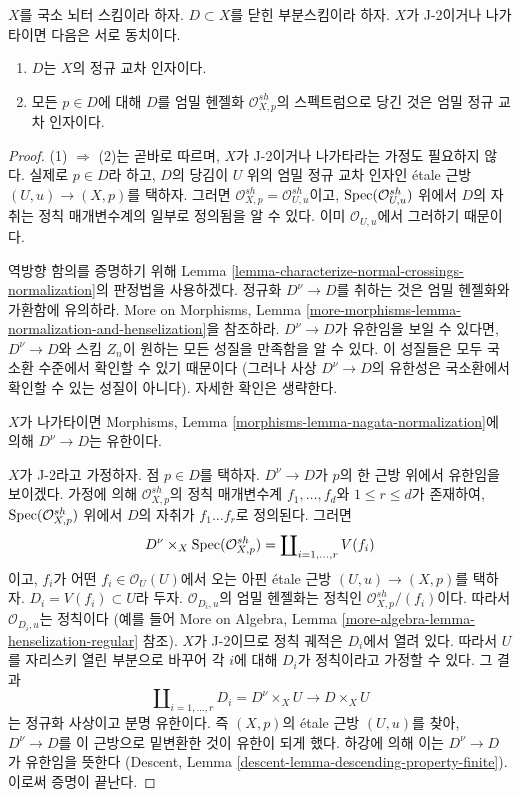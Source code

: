 \begin{lemma}
\label{lemma-characterize-normal-crossings}
$X$를 국소 뇌터 스킴이라 하자. $D \subset X$를 닫힌 부분스킴이라 하자.
$X$가 J-2이거나 나가타이면 다음은 서로 동치이다.
\begin{enumerate}
\item $D$는 $X$의 정규 교차 인자이다.
\item 모든 $p \in D$에 대해 $D$를 엄밀 헨젤화
$\mathcal{O}_{X, p}^{sh}$의 스펙트럼으로 당긴 것은
엄밀 정규 교차 인자이다.
\end{enumerate}
\end{lemma}

\begin{proof}
(1) $\Rightarrow$ (2)는 곧바로 따르며,
$X$가 J-2이거나 나가타라는 가정도 필요하지 않다.
실제로 $p \in D$라 하고, $D$의 당김이 $U$ 위의 엄밀 정규 교차 인자인
\'etale 근방 $(U, u) \to (X, p)$를 택하자.
그러면 $\mathcal{O}_{X, p}^{sh} = \mathcal{O}_{U, u}^{sh}$이고,
$\mathop{\mathrm{Spec}}(\mathcal{O}_{U, u}^{sh})$ 위에서 $D$의 자취는
정칙 매개변수계의 일부로 정의됨을 알 수 있다.
이미 $\mathcal{O}_{U, u}$에서 그러하기 때문이다.

\medskip\noindent
역방향 함의를 증명하기 위해 Lemma
\ref{lemma-characterize-normal-crossings-normalization}의 판정법을 사용하겠다.
정규화 $D^\nu \to D$를 취하는 것은 엄밀 헨젤화와 가환함에 유의하라.
More on Morphisms, Lemma
\ref{more-morphisms-lemma-normalization-and-henselization}을 참조하라.
$D^\nu \to D$가 유한임을 보일 수 있다면,
$D^\nu \to D$와 스킴 $Z_n$이 원하는 모든 성질을 만족함을 알 수 있다.
이 성질들은 모두 국소환 수준에서 확인할 수 있기 때문이다
(그러나 사상 $D^\nu \to D$의 유한성은 국소환에서 확인할 수 있는
성질이 아니다). 자세한 확인은 생략한다.

\medskip\noindent
$X$가 나가타이면 Morphisms, Lemma
\ref{morphisms-lemma-nagata-normalization}에 의해
$D^\nu \to D$는 유한이다.

\medskip\noindent
$X$가 J-2라고 가정하자. 점 $p \in D$를 택하자.
$D^\nu \to D$가 $p$의 한 근방 위에서 유한임을 보이겠다.
가정에 의해 $\mathcal{O}_{X, p}^{sh}$의 정칙 매개변수계
$f_1, \ldots, f_d$와 $1 \leq r \leq d$가 존재하여,
$\mathop{\mathrm{Spec}}(\mathcal{O}_{X, p}^{sh})$ 위에서 $D$의 자취가
$f_1 \ldots f_r$로 정의된다. 그러면
$$
D^\nu \times_X \mathop{\mathrm{Spec}}(\mathcal{O}_{X, p}^{sh}) = 
\coprod\nolimits_{i = 1, \ldots, r} V(f_i)
$$
이고, $f_i$가 어떤 $f_i \in \mathcal{O}_U(U)$에서 오는
아핀 \'etale 근방 $(U, u) \to (X, p)$를 택하자.
$D_i = V(f_i) \subset U$라 두자.
$\mathcal{O}_{D_i, u}$의 엄밀 헨젤화는 정칙인
$\mathcal{O}_{X, p}^{sh}/(f_i)$이다.
따라서 $\mathcal{O}_{D_i, u}$는 정칙이다
(예를 들어 More on Algebra, Lemma
\ref{more-algebra-lemma-henselization-regular} 참조).
$X$가 J-2이므로 정칙 궤적은 $D_i$에서 열려 있다.
따라서 $U$를 자리스키 열린 부분으로 바꾸어
각 $i$에 대해 $D_i$가 정칙이라고 가정할 수 있다.
그 결과
$$
\coprod\nolimits_{i = 1, \ldots, r} D_i = D^\nu \times_X U
\longrightarrow D \times_X U
$$
는 정규화 사상이고 분명 유한이다.
즉 $(X, p)$의 \'etale 근방 $(U, u)$를 찾아,
$D^\nu \to D$를 이 근방으로 밑변환한 것이 유한이 되게 했다.
하강에 의해 이는 $D^\nu \to D$가 유한임을 뜻한다
(Descent, Lemma \ref{descent-lemma-descending-property-finite}).
이로써 증명이 끝난다.
\end{proof}













